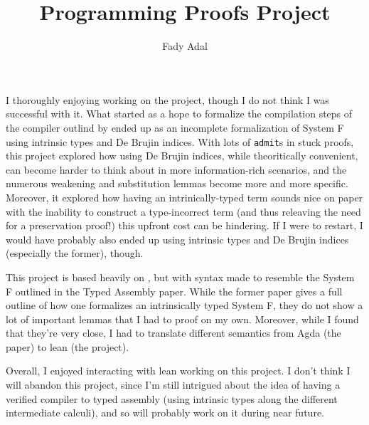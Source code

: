 \documentclass[12pt,a4paper]{article}
\title{Programming Proofs Project}
\author{Fady Adal}
\begin{document}
\maketitle

I thoroughly enjoying working on the project, though I do not think I was successful with it. What started as a hope to formalize the compilation steps of the compiler outlind by \cite{morrisett1999} ended up as an incomplete formalization of System F using intrinsic types and De Brujin indices. With lots of \texttt{admit}s in stuck proofs, this project explored how using De Brujin indices, while theoritically convenient, can become harder to think about in more information-rich scenarios, and the numerous weakening and substitution lemmas become more and more specific. Moreover, it explored how having an intrinically-typed term sounds nice on paper with the inability to construct a type-incorrect term (and thus releaving the need for a preservation proof!) this upfront cost can be hindering. If I were to restart, I would have probably also ended up using intrinsic types and De Brujin indices (especially the former), though.

This project is based heavily on \cite{chapman2019}, but with syntax made to resemble the System F outlined in the Typed Assembly paper. While the former paper gives a full outline of how one formalizes an intrinsically typed System F, they do not show a lot of important lemmas that I had to proof on my own. Moreover, while I found that they're very close, I had to translate different semantics from Agda (the paper) to lean (the project).

Overall, I enjoyed interacting with lean working on this project. I don't think I will abandon this project, since I'm still intrigued about the idea of having a verified compiler to typed assembly (using intrinsic types along the different intermediate calculi), and so will probably work on it during near future.



\end{document}
